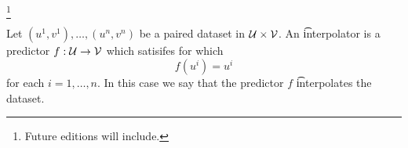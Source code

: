 
  \ifhmode\unskip\fi\footnote{
Future editions will include.
  }


Let $(u^1, v^1), \dots, (u^n, v^n)$ be a paired dataset in $\mathcal{U} \times \mathcal{V}$.
An \t{interpolator} is a predictor $f: \mathcal{U} \to \mathcal{V}$ which satisifes for which
  \[
f(u^i) = u^i
  \]
for each $i = 1 , \dots, n$.
In this case we say that the predictor $f$ \t{interpolates} the dataset.

\blankpage
